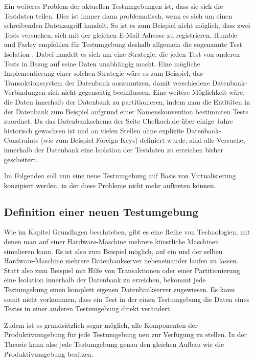 Ein weiteres Problem der aktuellen Testumgebungen ist, dass sie sich die Testdaten teilen. Dies ist immer dann problematisch, wenn es sich um einen schreibenden Datenzugriff handelt. So ist es zum Beispiel nicht möglich, dass zwei Tests versuchen, sich mit der gleichen E-Mail-Adresse zu registrieren. Humble und Farley empfehlen für Testumgebung deshalb allgemein die sogenannte Test Isolation \citep[Vgl.][S. 337]{HumFar10}. Dabei handelt es sich um eine Strategie, die jeden Test von anderen Tests in Bezug auf seine Daten unabhängig macht. Eine mögliche Implementierung einer solchen Strategie wäre es zum Beispiel, das Transaktionssystem der Datenbank auszunutzen, damit verschiedene Datenbank-Verbindungen sich nicht gegenseitig beeinflussen. Eine weitere Möglichkeit wäre, die Daten innerhalb der Datenbank zu partitionieren, indem man die Entitäten in der Datenbank zum Beispiel aufgrund einer Namenskonvention bestimmten Tests zuordnet. Da das Datenbankschema der Seite Chefkoch.de über einige Jahre historisch gewachsen ist und an vielen Stellen ohne explizite Datenbank-Constraints (wie zum Beispiel Foreign-Keys) definiert wurde, sind alle Versuche, innerhalb der Datenbank eine Isolation der Testdaten zu erreichen bisher gescheitert.

Im Folgenden soll nun eine neue Testumgebung auf Basis von Virtualisierung konzipiert werden, in der diese Probleme nicht mehr auftreten können.

\subsection{Definition einer neuen Testumgebung}

Wie im Kapitel Grundlagen beschrieben, gibt es eine Reihe von Technologien, mit denen man auf einer Hardware-Maschine mehrere künstliche Maschinen simulieren kann. Es ist also zum Beispiel möglich, auf ein und der selben Hardware-Maschine mehrere Datenbankserver nebeneinander laufen zu lassen. Statt also zum Beispiel mit Hilfe von Transaktionen oder einer Partitionierung eine Isolation innerhalb der Datenbank zu erreichen, bekommt jede Testumgebung einen komplett eigenen Datenbankserver zugewiesen. Es kann somit nicht vorkommen, dass ein Test in der einen Testumgebung die Daten eines Testes in einer anderen Testumgebung direkt verändert.

Zudem ist es grundsätzlich sogar möglich, alle Komponenten der Produktivumgebung für jede Testumgebung neu zur Verfügung zu stellen. In der Theorie kann also jede Testumgebung genau den gleichen Aufbau wie die Produktivumgebung besitzen.

